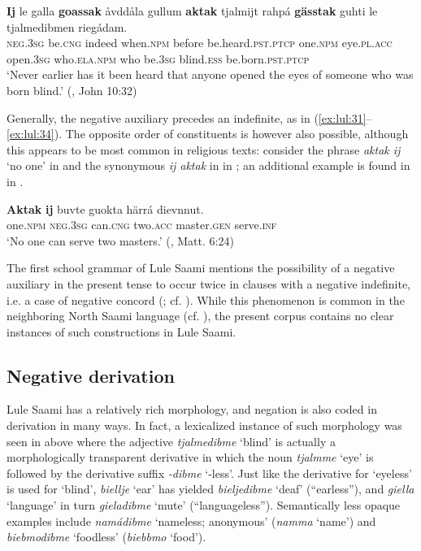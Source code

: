 \documentclass[output=paper,colorlinks,citecolor=brown]{langscibook}
\begin{document}
\ea\label{ex:lul:34} 
    \gll \textbf{Ij} le galla \textbf{goassak} åvddåla gullum \textbf{aktak} tjalmijt rahpá \textbf{gässtak} guhti le tjalmedibmen riegádam.\\ 
         \textsc{neg.3sg} be.\textsc{cng} indeed when.\textsc{npm} before be.heard.\textsc{pst.ptcp} one.\textsc{npm} eye.\textsc{pl.acc} open.\textsc{3sg} who.\textsc{ela.npm} who be.\textsc{3sg} blind.\textsc{ess} be.born.\textsc{pst.ptcp}\\
    \glt  ‘Never earlier has it been heard that anyone opened the eyes of someone who was born blind.’ (\citealt{SIKOR2021}, John 10:32)
\z 

Generally, the negative auxiliary precedes an indefinite, as in (\ref{ex:lul:31}--\ref{ex:lul:34}). The opposite order of constituents is however also possible, although this appears to be most common in religious texts: consider the phrase \textit{aktak ij} ‘no one’ in  and the synonymous \textit{ij aktak} in  in ; an additional example is found in  in .

\ea\label{ex:lul:35} 
    \gll \textbf{Aktak} \textbf{ij} buvte guokta härrá dievnnut. \\ 
         one.\textsc{npm} \textsc{neg.3sg} can.\textsc{cng} two.\textsc{acc} master.\textsc{gen} serve.\textsc{inf} \\
    \glt ‘No one can serve two masters.’ (\citealt{SIKOR2021}, Matt. 6:24)
\z 

The first school grammar of Lule Saami mentions the possibility of a negative auxiliary in the present tense to occur twice in clauses with a negative indefinite, i.e. a case of negative concord (\citealt[116]{Wiklund1915}; cf. \citealt[52--53]{Blokland2022}). While this phenomenon is common in the neighboring North Saami language (cf. \citealt[207]{Svonni2018}), the present corpus contains no clear instances of such constructions in Lule Saami.

\subsection{Negative derivation} \label{sec:lul:3.3}
Lule Saami has a relatively rich morphology, and negation is also coded in derivation in many ways. In fact, a lexicalized instance of such morphology was seen in  above where the adjective \textit{tjalmedibme} ‘blind’ is actually a morphologically transparent derivative in which the noun \textit{tjalmme} ‘eye’ is followed by the derivative suffix \textit{{}-dibme} ‘{}-less’. Just like the derivative for ‘eyeless’ is used for ‘blind’, \textit{biellje} ‘ear’ has yielded \textit{bieljedibme} ‘deaf’ (“earless”), and \textit{giella} ‘language’ in turn \textit{gieladibme} ‘mute’ (“languageless”). Semantically less opaque examples include \textit{namádibme} ‘nameless; anonymous’ (\leftarrow\space \textit{namma} ‘name’) and \textit{biebmodibme} ‘foodless’ (\leftarrow\space \textit{biebbmo} ‘food’).
\end{document}
